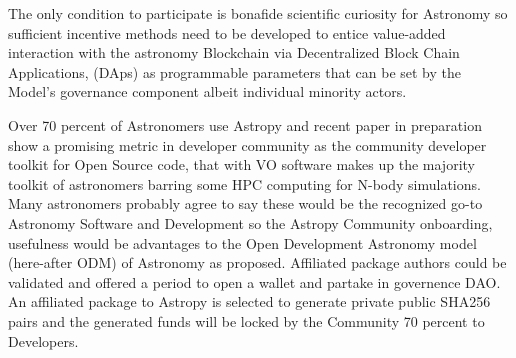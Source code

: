 \documentclass[final,5p,times,twocolumn,authoryear]{elsarticle}
\begin{document}
The only condition to participate is bonafide scientific curiosity for Astronomy so sufficient incentive methods need to be developed to entice value-added interaction with the astronomy Blockchain via Decentralized Block Chain Applications, (DAps) as programmable parameters that can be set by the Model's governance component albeit individual minority actors. 


Over 70 percent of Astronomers use  Astropy and recent paper in preparation show a promising metric in developer community as the community developer toolkit for Open Source code, that with VO software makes up the majority toolkit of astronomers barring some HPC computing for N-body simulations. Many astronomers probably agree to say these would be the recognized go-to  Astronomy Software and Development so the Astropy Community onboarding, usefulness would be advantages to the Open Development Astronomy model (here-after ODM) of Astronomy as proposed. Affiliated package authors could be validated and offered a period to open a wallet and partake in governence DAO. An affiliated package to Astropy is selected to generate private public SHA256 pairs and the generated funds will be locked by the Community 70 percent to Developers. 
\end{document}
